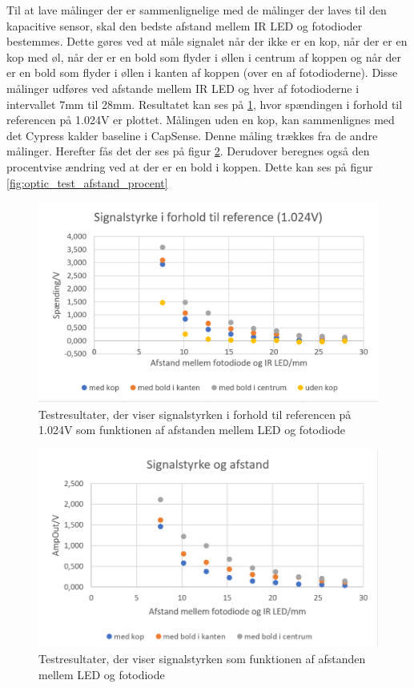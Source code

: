 \documentclass[HardwareDesign/HardwareDesign_main.tex]{subfiles}
\begin{document}
Til at lave målinger der er sammenlignelige med de målinger der laves til den kapacitive sensor, skal den bedste afstand mellem IR LED og fotodioder bestemmes. Dette gøres ved at måle signalet når der ikke er en kop, når der er en kop med øl, når der er en bold som flyder i øllen i centrum af koppen og når der er en bold som flyder i øllen i kanten af koppen (over en af fotodioderne). Disse målinger udføres ved afstande mellem IR LED og hver af fotodioderne i intervallet 7mm til 28mm. Resultatet kan ses på \ref{fig:optic_test_afstand_raw}, hvor spændingen i forhold til referencen på 1.024V er plottet.
Målingen uden en kop, kan sammenlignes med det Cypress kalder baseline i CapSense. Denne måling trækkes fra de andre målinger. Herefter fås det der ses på figur \ref{fig:optic_test_afstand}. Derudover beregnes også den procentvise ændring ved at der er en bold i koppen. Dette kan ses på figur \ref{fig:optic_test_afstand_procent}

\begin{figure}[H]
    \centering
    \includegraphics[width=\textwidth]{HardwareDesign/CupSensor/graphics/OpticTest/beer_afstand_raw.PNG}
    \caption{Testresultater, der viser signalstyrken i forhold til referencen på 1.024V som funktionen af afstanden mellem LED og fotodiode}
    \label{fig:optic_test_afstand_raw}
\end{figure}

\begin{figure}[H]
    \centering
    \includegraphics[width=\textwidth]{HardwareDesign/CupSensor/graphics/OpticTest/beer_afstand.PNG}
    \caption{Testresultater, der viser signalstyrken som funktionen af afstanden mellem LED og fotodiode}
    \label{fig:optic_test_afstand}
\end{figure}
\end{document}
